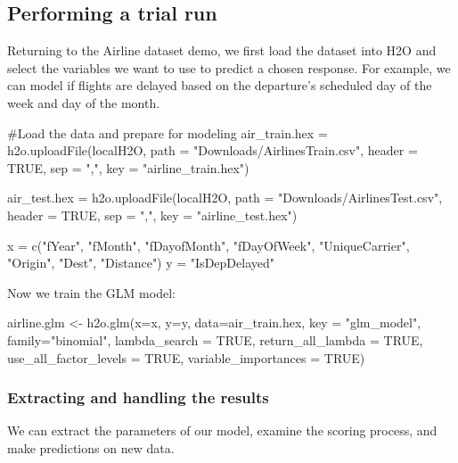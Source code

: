 \documentclass[11pt]{article}
\begin{document}
\subsection{Performing a trial run} \label{3.2}
Returning to the Airline dataset demo, we first load the dataset into H2O and select the variables we want to use to predict a chosen response. For example, we can model if flights are delayed based on the departure's scheduled day of the week and day of the month.

\begin{spverbatim}

#Load the data and prepare for modeling
air_train.hex = h2o.uploadFile(localH2O, path = "Downloads/AirlinesTrain.csv", header = TRUE, sep = ",", key = "airline_train.hex")

air_test.hex = h2o.uploadFile(localH2O, path = "Downloads/AirlinesTest.csv", header = TRUE, sep = ",", key = "airline_test.hex")

x = c("fYear", "fMonth", "fDayofMonth", "fDayOfWeek", "UniqueCarrier", "Origin", "Dest", "Distance")
y = "IsDepDelayed" 

\end{spverbatim}

Now we train the GLM model:

\begin{spverbatim}
airline.glm <- h2o.glm(x=x, 
                       y=y, 
                       data=air_train.hex,
                       key = "glm_model",
                       family="binomial",
                       lambda_search = TRUE,
                       return_all_lambda = TRUE,
                       use_all_factor_levels = TRUE,
                       variable_importances = TRUE)
\end{spverbatim}

\subsubsection{Extracting and handling the results} \label{3.2.1}

We can extract the parameters of our model, examine the scoring process, and make predictions on new data.
\end{document}
